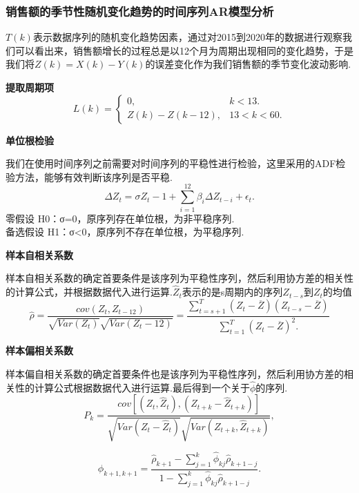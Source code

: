 \documentclass{whutmod}
\begin{document}
	\subsubsection{销售额的季节性随机变化趋势的时间序列AR模型分析}
	$T(k)$表示数据序列的随机变化趋势因素，通过对2015到2020年的数据进行观察我们可以看出来，销售额增长的过程总是以12个月为周期出现相同的变化趋势，于是我们将$Z(k)=X(k)-Y(k)$的误差变化作为我们销售额的季节变化波动影响.
	
	\textbf{提取周期项}
	\begin{equation}
	L(k)=\begin{cases} 
		0,&k<13. \\
		Z(k)-Z(k-12),&13<k<60.
		\end{cases}
	\end{equation}
	
	\textbf{单位根检验}
	
	我们在使用时间序列之前需要对时间序列的平稳性进行检验，这里采用的ADF检验方法，能够有效判断该序列是否平稳.
	\begin{equation}
		\Delta Z_t=\sigma Z_t-1+\sum_{i=1}^{12}\beta_{i}\Delta Z_{t-i}+\epsilon_t.
	\end{equation}
	零假设 H0：σ=0，原序列存在单位根，为非平稳序列.\\
	备选假设 H1：σ<0，原序列不存在单位根，为平稳序列.
	
	\textbf{样本自相关系数}
	
	样本自相关系数的确定首要条件是该序列为平稳性序列，然后利用协方差的相关性的计算公式，并根据数据代入进行运算.$\hat Z_t$表示的是s周期内的序列$Z_{t-s}$到$Z_t$的均值
	\begin{equation}
	\hat \rho=\frac{cov(Z_t,Z_{t-12})}{\sqrt{Var(Z_t)}\sqrt{Var(Z_t-12)}}=\frac{\sum_{t=s+1}^{T}(Z_t-\overline Z)(Z_{t-s}-\overline Z)}{\sum_{t=1}^{T}(Z_t-\overline Z)^2.}
	\end{equation}
	
	\textbf{样本偏相关系数}
	
	样本偏自相关系数的确定首要条件也是该序列为平稳性序列，然后利用协方差的相关性的计算公式根据数据代入进行运算.最后得到一个关于$\hat{\phi}$的序列.
	\begin{equation}
	P_k=\frac{cov[(Z_t,\hat Z_t),(Z_{t+k}-\hat{Z}_{t+k})]}{\sqrt{Var(Z_t-\hat Z_t)}\sqrt{Var(Z_{t+k},\hat{Z}_{t+k})}},
	\end{equation}
	
	\begin{equation}
	\hat{\phi}_{k+1,k+1}=\frac{\hat{\rho}_{k+1}-\sum_{j=1}^k \hat{\phi}_{kj}\hat{\rho}_{k+1-j}}{1-\sum_{j=1}^k\hat{\phi}_{kj}\hat{\rho}_{k+1-j}}.
	\end{equation}
	
\end{document}
